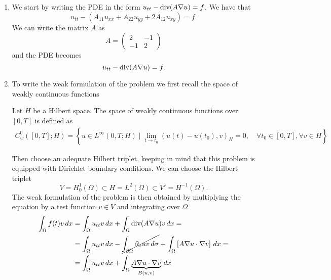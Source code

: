 \begin{enumerate}
    \item We start by writing the PDE in the form \(u_{tt} - \text{div}(A \nabla u) = f\). We
          have that
          \[
              u_{tt} - \left(A_{11} u_{xx} + A_{22} u_{yy} + 2A_{12} u_{xy}\right) = f.
          \]
          We can write the matrix \(A\) as
          \[
              A = \begin{pmatrix}
                  2  & -1 \\
                  -1 & 2
              \end{pmatrix}
          \]
          and the PDE becomes
          \[
              u_{tt} - \text{div} (A \nabla u) = f.
          \]
    \item To write the weak formulation of the problem we first recall the space of
          weakly continuous functions
          \begin{remark}
              Let \(H\) be a Hilbert space. The space of weakly continuous functions over \([0, T]\) is defined as
              \[
                  \begin{split}
                      C_w^0([0, T]; H) = \left\{ u \in L^\infty(0, T; H) \mid \lim_{t \to t_0} (u(t) - u(t_0), v)_H = 0, \quad \forall t_0 \in [0, T], \forall v \in H \right\}
                  \end{split}
              \]
          \end{remark}
          Then choose an adequate Hilbert triplet, keeping in mind that this problem is equipped with Dirichlet boundary conditions. We can choose the Hilbert triplet
          \[
              V = H^1_0(\Omega) \subset H = L^2(\Omega) \subset V' = H^{-1}(\Omega).
          \]
          The weak formulation of the problem is then obtained by multiplying the
          equation by a test function \(v \in V\) and integrating over \(\Omega\)
          \begin{align*}
              \int_\Omega f(t) v \, dx & = \int_\Omega u_{tt} v \, dx + \int_\Omega \text{div}(A \nabla u)v \, dx =                                                                                  \\
                                       & = \int_\Omega u_{tt} v \, dx - \cancel{\int_{\partial\Omega} \partial_\nu u v \, d\sigma} + \int_\Omega \left[A \nabla u \cdot \nabla v\right] \, dx = \\
                                       & = \int_\Omega u_{tt} v \, dx + \int_\Omega \underbrace{A \nabla u \cdot \nabla v}_{B(u, v)} \, dx
          \end{align*}

\end{enumerate}
